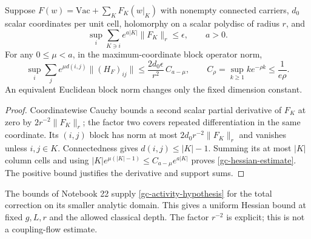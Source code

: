 \begin{lemma}
\label{gc-hessian-bound}
Suppose $F(w)=\mathrm{Vac}+\sum_K F_K(w|_K)$ with nonempty connected
carriers, $d_0$ scalar coordinates per unit cell, holomorphy on a
scalar polydisc of radius $r$, and
\begin{equation}\label{gc-activity-hypothesis}
 \sup_i\sum_{K\ni i} e^{a|K|}\|F_K\|_r\le\epsilon,\qquad a>0.
\end{equation}
For any $0\le\mu<a$, in the maximum-coordinate block operator norm,
\begin{equation}\label{gc-hessian-estimate}
 \sup_i\sum_j e^{\mu d(i,j)}\|(H_F)_{ij}\|
 \le \frac{2d_0\epsilon}{r^2}\,
          C_{a-\mu},\qquad
 C_\rho=\sup_{k\ge1}k e^{-\rho k}\le\frac1{e\rho}.
\end{equation}
An equivalent Euclidean block norm changes only the fixed
dimension constant.
\end{lemma}
\begin{proof}
Coordinatewise Cauchy bounds a second scalar partial derivative
of $F_K$ at zero by $2r^{-2}\|F_K\|_r$; the factor two covers
repeated differentiation in the same coordinate. Its $(i,j)$
block has norm at most $2d_0r^{-2}\|F_K\|_r$ and vanishes unless
$i,j\in K$. Connectedness gives $d(i,j)\le |K|-1$.
Summing its at most $|K|$ column cells and using
$|K|e^{\mu(|K|-1)}\le C_{a-\mu}e^{a|K|}$
proves \eqref{gc-hessian-estimate}. The positive bound justifies
the derivative and support sums.
\end{proof}

The bounds of Notebook 22 supply \eqref{gc-activity-hypothesis}
for the total correction on its smaller analytic domain.
This gives a uniform Hessian bound at fixed $g,L,r$ and the
allowed classical depth. The factor $r^{-2}$ is explicit;
this is not a coupling-flow estimate.

